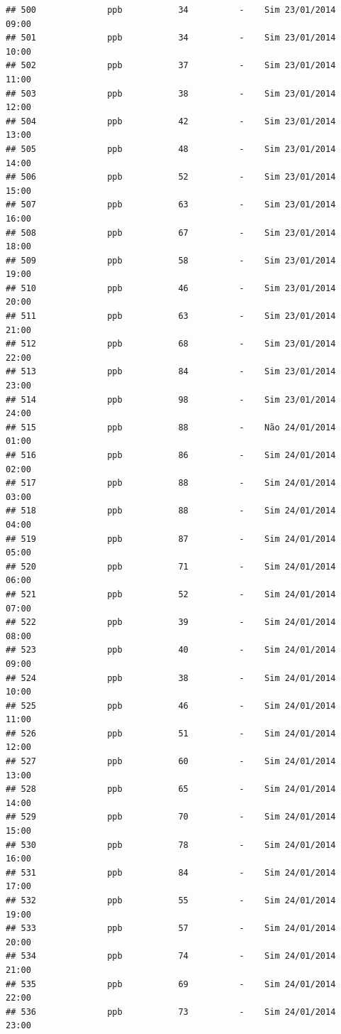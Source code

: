 \documentclass[]{book}
\begin{document}
\begin{verbatim}
## 500              ppb           34          -    Sim 23/01/2014 09:00
## 501              ppb           34          -    Sim 23/01/2014 10:00
## 502              ppb           37          -    Sim 23/01/2014 11:00
## 503              ppb           38          -    Sim 23/01/2014 12:00
## 504              ppb           42          -    Sim 23/01/2014 13:00
## 505              ppb           48          -    Sim 23/01/2014 14:00
## 506              ppb           52          -    Sim 23/01/2014 15:00
## 507              ppb           63          -    Sim 23/01/2014 16:00
## 508              ppb           67          -    Sim 23/01/2014 18:00
## 509              ppb           58          -    Sim 23/01/2014 19:00
## 510              ppb           46          -    Sim 23/01/2014 20:00
## 511              ppb           63          -    Sim 23/01/2014 21:00
## 512              ppb           68          -    Sim 23/01/2014 22:00
## 513              ppb           84          -    Sim 23/01/2014 23:00
## 514              ppb           98          -    Sim 23/01/2014 24:00
## 515              ppb           88          -    Não 24/01/2014 01:00
## 516              ppb           86          -    Sim 24/01/2014 02:00
## 517              ppb           88          -    Sim 24/01/2014 03:00
## 518              ppb           88          -    Sim 24/01/2014 04:00
## 519              ppb           87          -    Sim 24/01/2014 05:00
## 520              ppb           71          -    Sim 24/01/2014 06:00
## 521              ppb           52          -    Sim 24/01/2014 07:00
## 522              ppb           39          -    Sim 24/01/2014 08:00
## 523              ppb           40          -    Sim 24/01/2014 09:00
## 524              ppb           38          -    Sim 24/01/2014 10:00
## 525              ppb           46          -    Sim 24/01/2014 11:00
## 526              ppb           51          -    Sim 24/01/2014 12:00
## 527              ppb           60          -    Sim 24/01/2014 13:00
## 528              ppb           65          -    Sim 24/01/2014 14:00
## 529              ppb           70          -    Sim 24/01/2014 15:00
## 530              ppb           78          -    Sim 24/01/2014 16:00
## 531              ppb           84          -    Sim 24/01/2014 17:00
## 532              ppb           55          -    Sim 24/01/2014 19:00
## 533              ppb           57          -    Sim 24/01/2014 20:00
## 534              ppb           74          -    Sim 24/01/2014 21:00
## 535              ppb           69          -    Sim 24/01/2014 22:00
## 536              ppb           73          -    Sim 24/01/2014 23:00

\end{verbatim}
\end{document}
